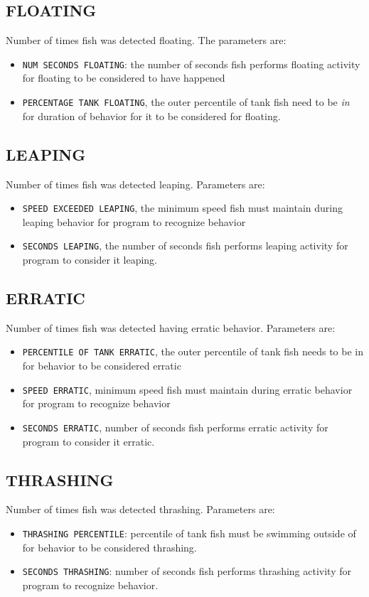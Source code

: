 \documentclass[12pt,titlepage]{report}
\begin{document}
\subsection{FLOATING}
Number of times fish was detected floating. The parameters are: 
\begin{itemize}
\item \texttt{NUM SECONDS FLOATING}: the number of seconds fish performs floating activity for floating to be considered to have happened 
\item \texttt{PERCENTAGE TANK FLOATING}, the outer percentile of tank fish need to be \emph{in} for duration of behavior for it to be considered for floating.                                                      
\end{itemize}
\subsection{LEAPING}
Number of times fish was detected leaping. Parameters are: 
\begin{itemize}
\item \texttt{SPEED EXCEEDED LEAPING}, the minimum speed fish must maintain during leaping behavior for program to recognize behavior
\item \texttt{SECONDS LEAPING}, the number of seconds fish performs leaping activity for program to consider it leaping.
\end{itemize}
\subsection{ERRATIC}
Number of times fish was detected having erratic behavior. Parameters are: 
\begin{itemize}
\item \texttt{PERCENTILE OF TANK ERRATIC}, the outer percentile of tank fish needs to be in for behavior to be considered erratic \item \texttt{SPEED ERRATIC}, minimum speed fish must maintain during erratic behavior for program to recognize behavior
\item \texttt{SECONDS ERRATIC}, number of seconds fish performs erratic activity for program to consider it erratic.
\end{itemize}
\subsection{THRASHING}
Number of times fish was detected thrashing. Parameters are: 
\begin{itemize}
\item \texttt{THRASHING PERCENTILE}: percentile of tank fish must be swimming outside of for behavior to be considered thrashing. \item \texttt{SECONDS THRASHING}: number of seconds fish performs thrashing activity for program to recognize behavior.
\end{itemize}
\end{document}
